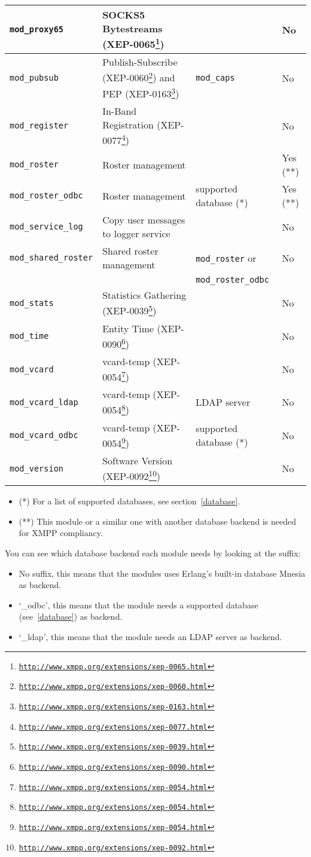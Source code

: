 \documentclass[a4paper,10pt]{book}
\newcommand{\module}[1]{\texttt{#1}}
\newcommand{\modcaps}{\module{mod\_caps}}
\newcommand{\modproxy}{\module{mod\_proxy65}}
\newcommand{\modpubsub}{\module{mod\_pubsub}}
\newcommand{\modregister}{\module{mod\_register}}
\newcommand{\modroster}{\module{mod\_roster}}
\newcommand{\modrosterodbc}{\module{mod\_roster\_odbc}}
\newcommand{\modservicelog}{\module{mod\_service\_log}}
\newcommand{\modsharedroster}{\module{mod\_shared\_roster}}
\newcommand{\modstats}{\module{mod\_stats}}
\newcommand{\modtime}{\module{mod\_time}}
\newcommand{\modvcard}{\module{mod\_vcard}}
\newcommand{\modvcardldap}{\module{mod\_vcard\_ldap}}
\newcommand{\modvcardodbc}{\module{mod\_vcard\_odbc}}
\newcommand{\modversion}{\module{mod\_version}}
\gdef\footahref#1#2{#2\footnote{\href{#1}{\texttt{#1}}}}
\newcommand{\txepref}[2]{\footahref{http://www.xmpp.org/extensions/xep-#1.html}{#2}}
\newcommand{\xepref}[1]{\txepref{#1}{XEP-#1}}
\begin{document}
\begin{table}[H]
\begin{tabular}{|l|l|l|l|}
    \hline \modproxy{} & SOCKS5 Bytestreams (\xepref{0065}) &  & No\\
    \hline \modpubsub{} & Publish-Subscribe (\xepref{0060}) and PEP (\xepref{0163}) & \modcaps{} & No \\ 
    \hline \modregister{} & In-Band Registration (\xepref{0077}) &  & No \\ 
    \hline \modroster{} & Roster management &  & Yes (**) \\ 
    \hline \modrosterodbc{} & Roster management & supported database (*) & Yes (**) \\ 
    \hline \modservicelog{} & Copy user messages to logger service &  & No \\ 
    \hline \modsharedroster{} & Shared roster management & \modroster{} or & No \\ 
    & & \modrosterodbc{} & \\ 
    \hline \modstats{} & Statistics Gathering (\xepref{0039}) &  & No \\ 
    \hline \modtime{} & Entity Time (\xepref{0090}) &  & No \\ 
    \hline \modvcard{} & vcard-temp (\xepref{0054}) &  & No \\ 
    \hline \modvcardldap{} & vcard-temp (\xepref{0054}) & LDAP server & No \\ 
    \hline \modvcardodbc{} & vcard-temp (\xepref{0054}) & supported database (*) & No \\ 
    \hline \modversion{} & Software Version (\xepref{0092}) &  & No\\
    \hline
  \end{tabular}
\end{table}

\begin{itemize}
\item (*) For a list of supported databases, see section~\ref{database}.
\item (**) This module or a similar one with another database backend is needed for
XMPP compliancy.
\end{itemize}

You can see which database backend each module needs by looking at the suffix:
\begin{itemize}
\item No suffix, this means that the modules uses Erlang's built-in database
  Mnesia as backend.
\item `\_odbc', this means that the module needs a supported database
  (see~\ref{database}) as backend.
\item `\_ldap', this means that the module needs an LDAP server as backend.
\end{itemize}
\end{document}
